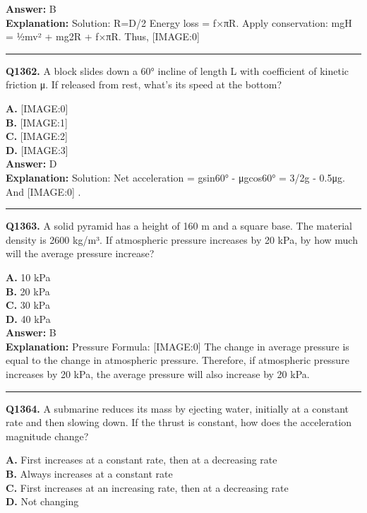 \documentclass[12pt]{article}
\begin{document}
\textbf{Answer:} B \\
\textbf{Explanation:} Solution: R=D/2
Energy loss = f×πR. Apply conservation: mgH = ½mv² + mg2R + f×πR.
Thus,
[IMAGE:0]

\hrule
\vspace{1em}


\noindent
\textbf{Q1362.} A block slides down a 60° incline of length L with coefficient of kinetic friction μ. If released from rest, what's its speed at the bottom?



\textbf{A.} [IMAGE:0] \\
\textbf{B.} [IMAGE:1] \\
\textbf{C.} [IMAGE:2] \\
\textbf{D.} [IMAGE:3] \\

\textbf{Answer:} D \\
\textbf{Explanation:} Solution: Net acceleration = gsin60° - μgcos60° = \sqrt{}3/2g - 0.5μg. And
[IMAGE:0]
.

\hrule
\vspace{1em}


\noindent
\textbf{Q1363.} A solid pyramid has a height of 160 m and a square base. The material density is 2600 kg/m³. If atmospheric pressure increases by 20 kPa, by how much will the average pressure increase?



\textbf{A.} 10 kPa \\
\textbf{B.} 20 kPa \\
\textbf{C.} 30 kPa \\
\textbf{D.} 40 kPa \\

\textbf{Answer:} B \\
\textbf{Explanation:} Pressure Formula:
[IMAGE:0]
The change in average pressure is equal to the change in atmospheric pressure. Therefore, if atmospheric pressure increases by 20 kPa, the average pressure will also increase by 20 kPa.

\hrule
\vspace{1em}


\noindent
\textbf{Q1364.} A submarine reduces its mass by ejecting water, initially at a constant rate and then slowing down. If the thrust is constant, how does the acceleration magnitude change?



\textbf{A.} First increases at a constant rate, then at a decreasing rate \\
\textbf{B.} Always increases at a constant rate \\
\textbf{C.} First increases at an increasing rate, then at a decreasing rate \\
\textbf{D.} Not changing \\
\end{document}
